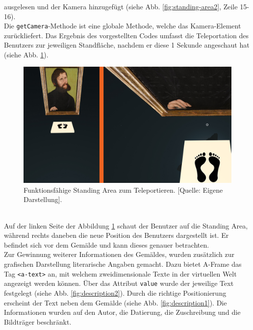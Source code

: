 \documentclass[a4paper,12pt,oneside]{article}
\begin{document}
        ausgelesen und der Kamera hinzugefügt 
        (siehe Abb. \ref{fig:standing-area2}, Zeile 15-16). \\
        Die 
        \texttt{getCamera}-Methode ist eine globale Methode, 
        welche das Kamera-Element zurückliefert. 
        Das Ergebnis des vorgestellten Codes umfasst die Teleportation
        des Benutzers zur jeweiligen Standfläche, nachdem er diese 1 Sekunde
        angeschaut hat
        (siehe Abb. \ref{fig:standing-area3}).
        \begin{figure}[h]
          \centering
          \includegraphics[scale=0.3]{img/coding/standing-area3.png}
          \caption[Funktionsfähige Standing Area zum Teleportieren.]{Funktionsfähige Standing Area zum Teleportieren. [Quelle: Eigene Darstellung].}
          \label{fig:standing-area3}
        \end{figure} \\
        Auf der linken Seite der Abbildung \ref{fig:standing-area3} schaut
        der Benutzer auf die Standing Area, während rechts daneben die neue
        Position des Benutzers dargestellt ist. Er befindet sich
        vor dem Gemälde und kann dieses genauer betrachten. \\
        Zur Gewinnung weiterer Informationen des Gemäldes, wurden
        zusätzlich zur grafischen Darstellung literarische Angaben gemacht.
        Dazu bietet A-Frame das Tag \texttt{<a-text>} an, mit welchem
        zweidimensionale Texte in der virtuellen Welt angezeigt werden können.
        Über das Attribut \texttt{value} wurde der jeweilige Text 
        festgelegt (siehe Abb. \ref{fig:description2}).
        Durch die richtige Positionierung erscheint der Text neben
        dem Gemälde (siehe Abb. \ref{fig:description1}).
        Die Informationen wurden auf den Autor, die Datierung, die Zuschreibung
        und die Bildträger beschränkt.
\end{document}
